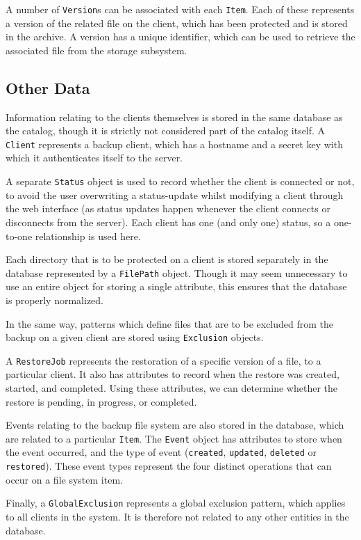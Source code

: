 A number of \verb!Version!s can be associated with each \verb!Item!. Each of
these represents a version of the related file on the client, which has been
protected and is stored in the archive. A version has a unique identifier,
which can be used to retrieve the associated file from the storage subsystem.

\subsection{Other Data}

Information relating to the clients themselves is stored in the same database
as the catalog, though it is strictly not considered part of the catalog
itself. A \verb!Client! represents a backup client, which has a hostname and
a secret key with which it authenticates itself to the server.

A separate \verb!Status! object is used to record whether the client is
connected or not, to avoid the user overwriting a status-update whilst
modifying a client through the web interface (as status updates happen whenever
the client connects or disconnects from the server). Each client has one (and
only one) status, so a one-to-one relationship is used here.

Each directory that is to be protected on a client is stored separately in the
database represented by a \verb!FilePath! object. Though it may seem
unnecessary to use an entire object for storing a single attribute, this
ensures that the database is properly normalized.

In the same way, patterns which define files that are to be excluded from the
backup on a given client are stored using \verb!Exclusion! objects.

A \verb!RestoreJob! represents the restoration of a specific version of a file,
to a particular client. It also has attributes to record when the restore was
created, started, and completed. Using these attributes, we can determine
whether the restore is pending, in progress, or completed.

Events relating to the backup file system are also stored in the database,
which are related to a particular \verb!Item!. The \verb!Event! object has
attributes to store when the event occurred, and the type of event
(\verb!created!, \verb!updated!, \verb!deleted! or \verb!restored!). These
event types represent the four distinct operations that can occur on a file
system item.

Finally, a \verb!GlobalExclusion! represents a global exclusion pattern, which
applies to all clients in the system. It is therefore not related to any other
entities in the database.

